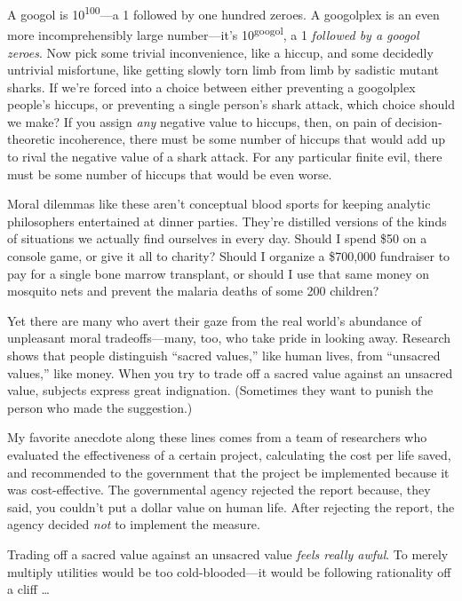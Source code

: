 {
 A googol is 10\textsuperscript{100}{}---a 1 followed by one
hundred zeroes. A googolplex is an even more incomprehensibly large
number---it's 10\textsuperscript{googol}, a 1
\textit{followed by a googol zeroes}. Now pick some trivial
inconvenience, like a hiccup, and some decidedly untrivial misfortune,
like getting slowly torn limb from limb by sadistic mutant sharks. If
we're forced into a choice between either preventing a
googolplex people's hiccups, or preventing a single
person's shark attack, which choice should we make? If
you assign \textit{any} negative value to hiccups, then, on pain of
decision-theoretic incoherence, there must be some number of hiccups
that would add up to rival the negative value of a shark attack. For
any particular finite evil, there must be some number of hiccups that
would be even worse.}

{
 Moral dilemmas like these aren't conceptual blood
sports for keeping analytic philosophers entertained at dinner parties.
They're distilled versions of the kinds of situations
we actually find ourselves in every day. Should I spend \$50 on a
console game, or give it all to charity? Should I organize a \$700,000
fundraiser to pay for a single bone marrow transplant, or should I use
that same money on mosquito nets and prevent the malaria deaths of some
200 children?}

{
 Yet there are many who avert their gaze from the real
world's abundance of unpleasant moral tradeoffs---many,
too, who take pride in looking away. Research shows that people
distinguish ``sacred values,'' like
human lives, from ``unsacred
values,'' like money. When you try to trade off a
sacred value against an unsacred value, subjects express great
indignation. (Sometimes they want to punish the person who made the
suggestion.)}

{
 My favorite anecdote along these lines comes from a team of
researchers who evaluated the effectiveness of a certain project,
calculating the cost per life saved, and recommended to the government
that the project be implemented because it was cost-effective. The
governmental agency rejected the report because, they said, you
couldn't put a dollar value on human life. After
rejecting the report, the agency decided \textit{not} to implement the
measure.}

{
 Trading off a sacred value against an unsacred value \textit{feels
really awful}. To merely multiply utilities would be too
cold-blooded---it would be following rationality off a cliff \ldots}


